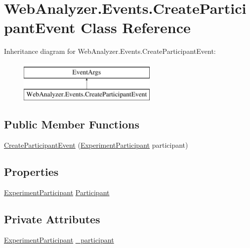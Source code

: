 \hypertarget{class_web_analyzer_1_1_events_1_1_create_participant_event}{}\section{Web\+Analyzer.\+Events.\+Create\+Participant\+Event Class Reference}
\label{class_web_analyzer_1_1_events_1_1_create_participant_event}
Inheritance diagram for Web\+Analyzer.\+Events.\+Create\+Participant\+Event\+:\begin{figure}[H]
\begin{center}
\leavevmode
\includegraphics[height=2.000000cm]{class_web_analyzer_1_1_events_1_1_create_participant_event}
\end{center}
\end{figure}
\subsection*{Public Member Functions}
\begin{DoxyCompactItemize}
\item 
\hyperlink{class_web_analyzer_1_1_events_1_1_create_participant_event_a1e477fe5448547a7b6c44baf9cceb16d}{Create\+Participant\+Event} (\hyperlink{class_web_analyzer_1_1_models_1_1_base_1_1_experiment_participant}{Experiment\+Participant} participant)
\end{DoxyCompactItemize}
\subsection*{Properties}
\begin{DoxyCompactItemize}
\item 
\hyperlink{class_web_analyzer_1_1_models_1_1_base_1_1_experiment_participant}{Experiment\+Participant} \hyperlink{class_web_analyzer_1_1_events_1_1_create_participant_event_a33ceb02517db8c73eac1753aedc7823c}{Participant}
\end{DoxyCompactItemize}
\subsection*{Private Attributes}
\begin{DoxyCompactItemize}
\item 
\hyperlink{class_web_analyzer_1_1_models_1_1_base_1_1_experiment_participant}{Experiment\+Participant} \hyperlink{class_web_analyzer_1_1_events_1_1_create_participant_event_aab15f3032d370af1d8518b7beb0cdfe4}{\+\_\+participant}
\end{DoxyCompactItemize}


